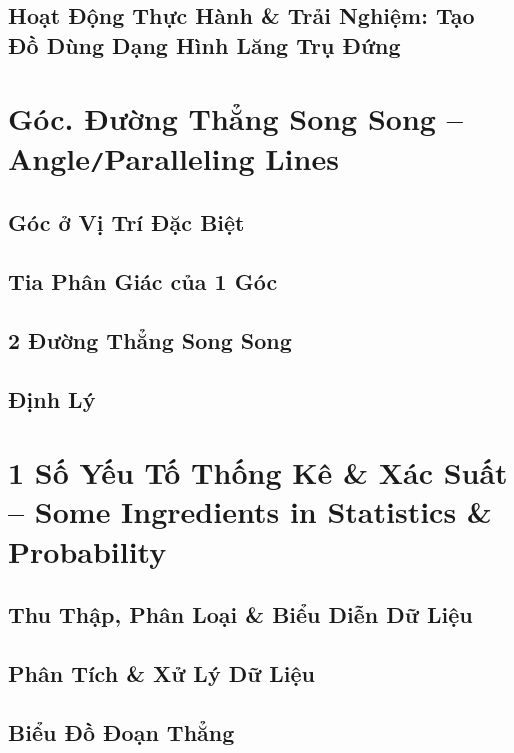 \documentclass[oneside]{book}
\numberwithin{equation}{section}
\begin{document}
\section{Hoạt Động Thực Hành \& Trải Nghiệm: Tạo Đồ Dùng Dạng Hình Lăng Trụ Đứng}


\chapter{Góc. Đường Thẳng Song Song -- Angle\texttt{/}Paralleling Lines}

\section{Góc ở Vị Trí Đặc Biệt}

\section{Tia Phân Giác của 1 Góc}

\section{2 Đường Thẳng Song Song}

\section{Định Lý}


\chapter{1 Số Yếu Tố Thống Kê \& Xác Suất -- Some Ingredients in Statistics \& Probability}

\section{Thu Thập, Phân Loại \& Biểu Diễn Dữ Liệu}

\section{Phân Tích \& Xử Lý Dữ Liệu}

\section{Biểu Đồ Đoạn Thẳng}
\end{document}
